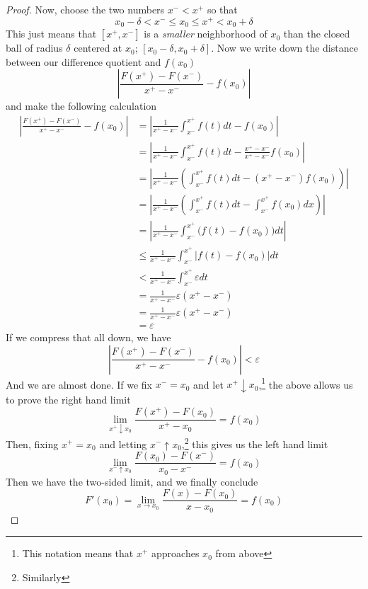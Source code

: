 \documentclass{article}
\begin{document}
\begin{proof}
    Now, choose the two numbers $x^- < x^+$ so that 
    \[
        x_0 - \delta < x^- \leq x_0 \leq x^+ < x_0 + \delta
    \]
    This just means that $[x^+, x^-]$ is a \emph{smaller} neighborhood of $x_0$ than the closed ball of radius $\delta$ centered at $x_0$; $[x_0 - \delta, x_0 + \delta]$. Now we write down the distance between our difference quotient and $f(x_0)$
    \[
        \left|\frac{F(x^+)-F(x^-)}{x^+-x^-} - f(x_0)\right|
    \]
    and make the following calculation 
    \begin{align*}
        \left|\frac{F(x^+)-F(x^-)}{x^+-x^-} - f(x_0)\right| &= \left|\frac{1}{x^+-x^-}\int_{x^-}^{x^+} f(t)dt - f(x_0)\right| \\
                                                            &= \left|\frac{1}{x^+-x^-}\int_{x^-}^{x^+} f(t)dt - \frac{x^+-x^-}{x^+-x^-}f(x_0)\right| \\
                                                            &= \left|\frac{1}{x^+-x^-}\left(\int_{x^-}^{x^+} f(t)dt - (x^+-x^-)f(x_0)\right)\right| \\
                                                            &= \left|\frac{1}{x^+-x^-}\left(\int_{x^-}^{x^+} f(t)dt - \int_{x^-}^{x^+}f(x_0)dx\right)\right| \\
                                                            &= \left|\frac{1}{x^+-x^-}\int_{x^-}^{x^+} \Big(f(t) - f(x_0)\Big)dt\right| \\
                                                            &\leq \frac{1}{x^+-x^-}\int_{x^-}^{x^+} \bigg|f(t) - f(x_0)\bigg|dt \\
                                                            &< \frac{1}{x^+-x^-}\int_{x^-}^{x^+} \varepsilon dt \\
                                                            &= \frac{1}{x^+-x^-}\varepsilon(x^+-x^-) \\
                                                            &= \frac{1}{x^+-x^-}\varepsilon(x^+-x^-) \\
                                                            &= \varepsilon
    \end{align*}
    If we compress that all down, we have
    \[
        \left|\frac{F(x^+)-F(x^-)}{x^+-x^-} - f(x_0)\right| < \varepsilon
    \]
    And we are almost done. If we fix $x^- = x_0$ and let $x^+\downarrow x_0$,\footnote{This notation means that $x^+$ approaches $x_0$ from above} the above allows us to prove the right hand limit
    \[
        \lim_{x^+\downarrow x_0}\frac{F(x^+)-F(x_0)}{x^+-x_0} = f(x_0)
    \]
    Then, fixing $x^+ = x_0$ and letting $x^- \uparrow x_0$,\footnote{Similarly} this gives us the left hand limit
    \[
        \lim_{x^-\uparrow x_0}\frac{F(x_0)-F(x^-)}{x_0-x^-} = f(x_0)
    \]
    Then we have the two-sided limit, and we finally conclude
    \[
        F'(x_0) = \lim_{x \to x_0}\frac{F(x)-F(x_0)}{x-x_0} = f(x_0)
    \]
\end{proof}
\end{document}
